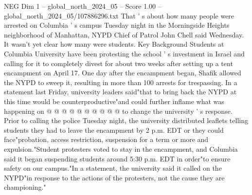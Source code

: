 \begin{textsample}{NEG Dim 1 – global\_north\_2024\_05 – Score 1.00 – global\_north\_2024\_05/107886296.txt}
That ' s about how many people were arrested on Columbia ' s campus Tuesday night in the Morningside Heights neighborhood of Manhattan, NYPD Chief of Patrol John Chell said Wednesday.
It wasn't yet clear how many were students.
Key Background Students at Columbia University have been protesting the school ' s investment in Israel and calling for it to completely divest for about two weeks after setting up a tent encampment on April 17.
One day after the encampment began, Shafik allowed the NYPD to sweep it, resulting in more than 100 arrests for trespassing.
In a statement last Friday, university leaders said"that to bring back the NYPD at this time would be counterproductive"and could further inflame what was happening on @ @ @ @ @ @ @ @ @ @ to change the university ' s response.
Prior to calling the police Tuesday night, the university distributed leaflets telling students they had to leave the encampment by 2 p.m.
EDT or they could face"probation, access restriction, suspension for a term or more and expulsion."Student protesters voted to stay in the encampment, and Columbia said it began suspending students around 5:30 p.m.
EDT in order"to ensure safety on our campus."In a statement, the university said it called on the NYPD"in response to the actions of the protesters, not the cause they are championing."

\end{textsample}
